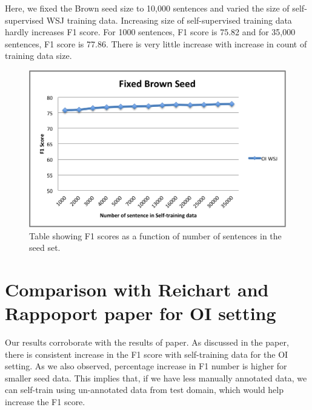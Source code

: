 Here, we fixed the Brown seed size to 10,000 sentences and varied the size of self-supervised WSJ training data. Increasing size of self-supervised training data hardly increases F1 score. For 1000 sentences, F1 score is 75.82 and for 35,000 sentences, F1 score is 77.86. There is very little increase with increase in count of training data size.

\begin{figure}[ht!]
\centering
\includegraphics[width=140mm]{exp4.png}
\caption{Table showing F1 scores as a function of number of sentences in the seed set. }
\label{accuracy}
\end{figure}

\section{Comparison with Reichart and Rappoport paper for OI setting}

Our results corroborate with the results of paper. As discussed in the paper, there is consistent increase in the F1 score with self-training data for the OI setting. As we also observed, percentage increase in F1 number is higher for smaller seed data. This implies that, if we have less manually annotated data, we can self-train using un-annotated data from test domain, which would help increase the F1 score.



